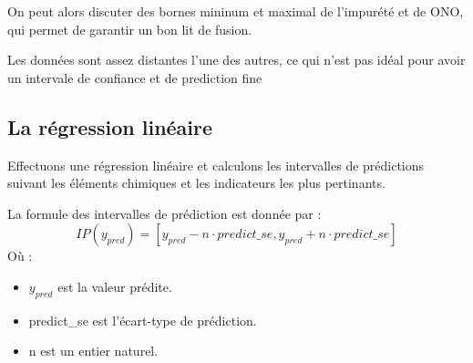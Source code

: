 \documentclass[12pt]{article}
\begin{document}
On peut alors discuter des bornes mininum et maximal de l'impurété et de ONO,
qui permet de garantir un bon lit de fusion.

Les données sont assez distantes l'une des autres, ce qui n'est pas idéal pour
avoir un intervale de confiance et de prediction fine


\subsection{La régression linéaire }


Effectuons une régression linéaire et calculons les intervalles de  prédictions 
suivant les éléments chimiques et les indicateurs les plus pertinants.


\medskip %

La formule des intervalles de prédiction est donnée par :
$$
IP (y_{pred}) = [y_{pred} - n \cdot predict\_se, y_{pred} + n \cdot predict\_se]
$$
Où :
\begin{itemize}
    \item $y_{pred}$ est la valeur prédite.
    \item predict\_se est  l'écart-type de prédiction.
    \item  n  est un entier naturel.
\end{itemize}






\end{document}
